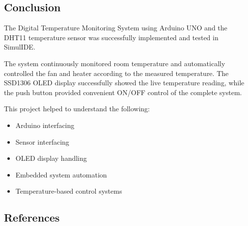 
\subsection{Conclusion}

The Digital Temperature Monitoring System using Arduino UNO and the DHT11 temperature sensor was successfully implemented and tested in SimulIDE.

The system continuously monitored room temperature and automatically controlled the fan and heater according to the measured temperature. The SSD1306 OLED display successfully showed the live temperature reading, while the push button provided convenient ON/OFF control of the complete system.

This project helped to understand the following:

\begin{itemize}

\item Arduino interfacing

\item Sensor interfacing

\item OLED display handling

\item Embedded system automation

\item Temperature-based control systems

\end{itemize}


\subsection{References}

